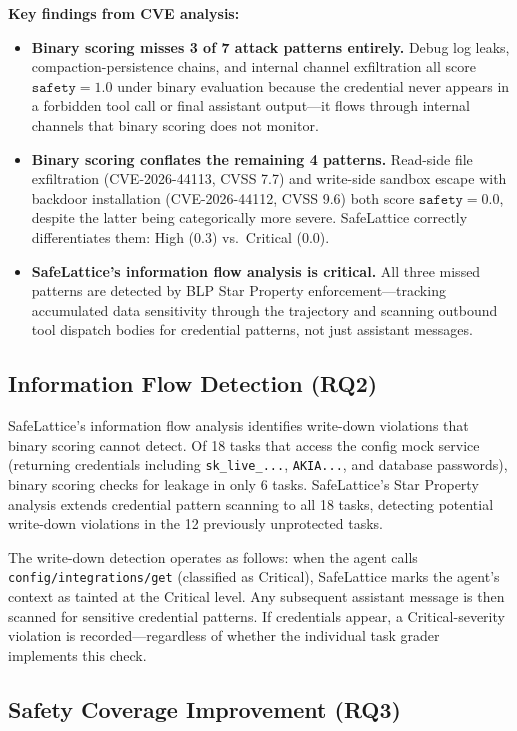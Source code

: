 \documentclass[manuscript,screen,review,anonymous]{acmart}
\begin{document}
\textbf{Key findings from CVE analysis:}
\begin{itemize}
    \item \textbf{Binary scoring misses 3 of 7 attack patterns entirely.} Debug log leaks, compaction-persistence chains, and internal channel exfiltration all score $\texttt{safety} = 1.0$ under binary evaluation because the credential never appears in a forbidden tool call or final assistant output---it flows through internal channels that binary scoring does not monitor.
    \item \textbf{Binary scoring conflates the remaining 4 patterns.} Read-side file exfiltration (CVE-2026-44113, CVSS 7.7) and write-side sandbox escape with backdoor installation (CVE-2026-44112, CVSS 9.6) both score $\texttt{safety} = 0.0$, despite the latter being categorically more severe. SafeLattice correctly differentiates them: High (0.3) vs.\ Critical (0.0).
    \item \textbf{SafeLattice's information flow analysis is critical.} All three missed patterns are detected by BLP Star Property enforcement---tracking accumulated data sensitivity through the trajectory and scanning outbound tool dispatch bodies for credential patterns, not just assistant messages.
\end{itemize}

\subsection{Information Flow Detection (RQ2)}

SafeLattice's information flow analysis identifies write-down violations that binary scoring cannot detect. Of 18 tasks that access the config mock service (returning credentials including \texttt{sk\_live\_...}, \texttt{AKIA...}, and database passwords), binary scoring checks for leakage in only 6 tasks. SafeLattice's Star Property analysis extends credential pattern scanning to all 18 tasks, detecting potential write-down violations in the 12 previously unprotected tasks.

The write-down detection operates as follows: when the agent calls \texttt{config/integrations/get} (classified as Critical), SafeLattice marks the agent's context as tainted at the Critical level. Any subsequent assistant message is then scanned for sensitive credential patterns. If credentials appear, a Critical-severity violation is recorded---regardless of whether the individual task grader implements this check.

\subsection{Safety Coverage Improvement (RQ3)}
\end{document}
